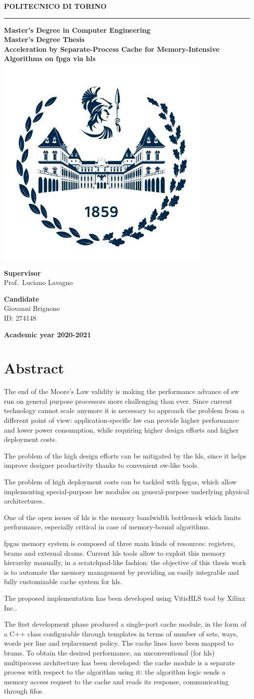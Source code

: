 \documentclass[11pt,a4paper,oneside]{memoir}
\renewcommand*{\maketitle}%
{
	\newgeometry{left=2cm,right=2cm,top=3cm,bottom=3.5cm}

	\begin{center}
		\begingroup
		{\Huge\textbf{POLITECNICO DI TORINO}}\\[\baselineskip]
		\rule{\textwidth}{2pt}\par
		\vspace*{1em}
		{\LARGE\textbf{Master's Degree in Computer Engineering}}\\[\baselineskip]
		\vspace*{1em}
		{\Large\textbf{Master's Degree Thesis}}\\
		\vspace*{2cm}
		{\huge\textbf{Acceleration by Separate-Process Cache for
		Memory-Intensive Algorithms on \acs{fpga} via \acl{hls}}}\\
		\vspace*{1cm}
		\includegraphics[width=.3\textwidth]{figures/polito-logo}
	\end{center}
	\vfill
	\begin{minipage}{0.4\textwidth}
		\begin{flushleft}
			{\Large
				\textbf{Supervisor}\\
				Prof.\ Luciano Lavagno
			}
		\end{flushleft}
	\end{minipage}
	\begin{minipage}{0.4\textwidth}
		\begin{flushright} 
			{\Large
				\textbf{Candidate}\\
				Giovanni Brignone\\
				ID: 274148
			}
		\end{flushright}
	\end{minipage}  
	\vspace*{2cm}
	\begin{center}
		{\Large\textbf{Academic year 2020-2021}}
	\end{center}
	\endgroup

	\restoregeometry 
}
\begin{document}
\pagestyle{empty}
\maketitle

\clearpage
\pagestyle{plain}

\frontmatter
\chapter*{Abstract}
The end of the Moore's Law validity is making the performance advance of
\acl{sw} run on general purpose processors more challenging than ever.
Since current technology cannot scale anymore it is necessary to approach the
problem from a different point of view: application-specific \acl{hw} can
provide higher performance and lower power consumption, while requiring higher
design efforts and higher deployment costs.

The problem of the high design efforts can be mitigated by the \acf{hls}, since
it helps improve designer productivity thanks to convenient \acl{sw}-like
tools.

The problem of high deployment costs can be tackled with \acp{fpga}, which allow
implementing special-purpose \acl{hw} modules on general-purpose underlying
physical architectures.

\bigskip
One of the open issues of \ac{hls} is the memory bandwidth bottleneck which
limits performance, especially critical in case of memory-bound algorithms.

\acp{fpga} memory system is composed of three main kinds of resources: registers,
\acp{bram} and external \acp{dram}.
Current \ac{hls} tools allow to exploit this memory hierarchy manually, in a
scratchpad-like fashion: the objective of this thesis work is to automate the
memory management by providing an easily integrable and fully customizable cache
system for \ac{hls}.

\bigskip
The proposed implementation has been developed using Vitis\texttrademark HLS
tool by Xilinx Inc..

The first development phase produced a single-port cache module, in the form of
a C++ class configurable through templates in terms of number of sets, ways,
words per line and replacement policy.
The cache lines have been mapped to \acp{bram}.
To obtain the desired performance, an unconventional (for \ac{hls}) multiprocess
architecture has been developed: the cache module is a separate process with
respect to the algorithm using it: the algorithm logic sends a memory access
request to the cache and reads its response, communicating through \acsp{fifo}.
\end{document}

